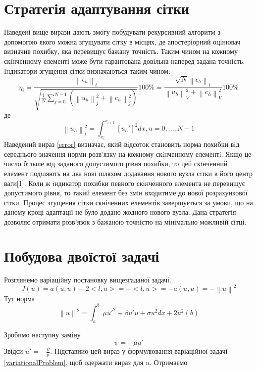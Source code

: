 \documentclass[a4paper]{article}
\newcommand\norm[1]{\left\lVert#1\right\rVert}
\numberwithin{equation}{section}
\begin{document}
\section{Стратегія адаптування сітки}
Наведені вище вирази дають змогу побудувати рекурсивний алгоритм з допомогою якого можна згущувати сітку в місцях, де апостеріорний оцінювач визначив похибку, яка перевищує бажану точність. Таким чином на кожному скінченному елементі може бути гарантована довільна наперед задана точність. Індикатори згущення сітки визначаються таким чином:
\begin{equation}\label{error}
\eta_i=\frac{\norm{\epsilon_h}_i}{\sqrt{ \frac{1}{N} \sum_{j=0}^{N-1}(\norm{u_h}_j^2 + \norm{e_h}_j^2)}}100\%=\frac{\sqrt{N}\norm{\epsilon_h}_i} {\norm{u_h}_V^2 + \norm{e_h}_V^2} 100\%
\end{equation}
де
\begin{equation}
\norm{u_h}_i^2 = \int_{x_i}^{x_{i+1}} [u_h'] ^ 2 dx, u=0,\ldots, N-1
\end{equation}
Наведений вираз \ref{error} визначає, який вiдсоток становить норма похибки вiд середнього значення норми розв’язку на кожному скiнченному елементi. Якщо це число бiльше вiд заданого допустимого рiвня похибки, то цей скiнченний елемент подiляють на два новi шляхом додавання нового вузла сiтки в його центр ваги[1]. Коли ж iндикатор похибки певного скiнченного елемента не перевищує допустимого рiвня, то такий елемент без змiн входитиме до нової розрахункової сiтки. Процес згущення сітки скніченних елементів завершується за умови, що на даному кроці адаптації не було додано жодного нового вузла.
Дана стратегія дозволяє отримати розв'язок з бажаною точністю на мінімально можливій сітці.

\section{Побудова двоїстої задачі}
Розглянемо варіаційну постановку вищезгаданої задачі.
\begin{equation}
J(u) = a(u,u) - 2<l,u> = -<l,u> = -a(u,u) = -\norm{u}^2
\end{equation}
Тут норма \begin{equation}
\norm{u} ^ 2 = \int_a^b\ \mu u'^2 + \beta u' u + \sigma u ^ 2dx + 2u^2(b)
\end{equation} 

Зробимо наступну заміну
\begin{equation}\label{replacement}
\psi = -\mu u'
\end{equation}
Звідси $ u' = - \frac{ \psi } { \mu }$. Підставиио цей вираз у формулювання варіаційної задачі \ref{variationalProblem}, щоб одержати вираз для $ u $. Отримаємо
\end{document}

